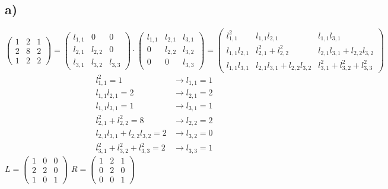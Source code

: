 \documentclass[10pt,a4paper]{article}
\begin{document}
\subsection*{a)}
$\left(\begin{matrix}
            1 & 2 & 1 \\
            2 & 8 & 2 \\
            1 & 2 & 2
        \end{matrix}\right)
    =\left(\begin{matrix}
            l_{1,1} & 0       & 0       \\
            l_{2,1} & l_{2,2} & 0       \\
            l_{3,1} & l_{3,2} & l_{3,3}
        \end{matrix}\right)
    \cdot\left(\begin{matrix}
            l_{1,1} & l_{2,1} & l_{3,1} \\
            0       & l_{2,2} & l_{3,2} \\
            0       & 0       & l_{3,3}
        \end{matrix}\right)
    =\left(\begin{matrix}
            l_{1,1}^2      & l_{1,1}l_{2,1}                & l_{1,1}l_{3,1}                \\
            l_{1,1}l_{2,1} & l_{2,1}^2+l_{2,2}^2           & l_{2,1}l_{3,1}+l_{2,2}l_{3,2} \\
            l_{1,1}l_{3,1} & l_{2,1}l_{3,1}+l_{2,2}l_{3,2} & l_{3,1}^2+l_{3,2}^2+l_{3,3}^2
        \end{matrix}\right)$\\
\begin{align*}
    l_{1,1}^2 = 1                     & \rightarrow l_{1,1} = 1 \\
    l_{1,1}l_{2,1} = 2                & \rightarrow l_{2,1} = 2 \\
    l_{1,1}l_{3,1} = 1                & \rightarrow l_{3,1} = 1 \\
    l_{2,1}^2+l_{2,2}^2 = 8           & \rightarrow l_{2,2} = 2 \\
    l_{2,1}l_{3,1}+l_{2,2}l_{3,2} = 2 & \rightarrow l_{3,2} = 0 \\
    l_{3,1}^2+l_{3,2}^2+l_{3,3}^2 = 2 & \rightarrow l_{3,3} = 1
\end{align*}
$L=\left(\begin{matrix}
            1 & 0 & 0 \\
            2 & 2 & 0 \\
            1 & 0 & 1
        \end{matrix}\right)$
$R=\left(\begin{matrix}
            1 & 2 & 1 \\
            0 & 2 & 0 \\
            0 & 0 & 1
        \end{matrix}\right)$
\end{document}
